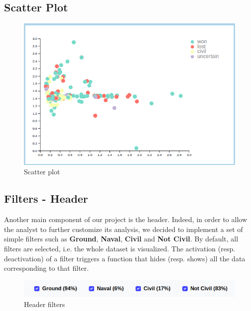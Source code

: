\subsection{Scatter Plot}
\begin{figure}[h]
\centering
\includegraphics[scale=0.30]{./images/scatter_plot.png}
\caption{Scatter plot}
\end{figure}

\subsection{Filters - Header}
Another main component of our project is the header. Indeed, in order to allow the analyst to further customize its analysis, we decided to implement a set of simple filters such as \textbf{Ground}, \textbf{Naval}, \textbf{Civil} and \textbf{Not Civil}. By default, all filters are selected, i.e. the whole dataset is visualized. The activation (resp. deactivation) of a filter triggers a function that hides (resp. shows) all the data corresponding to that filter.
\begin{figure}[h]
\centering
\includegraphics[scale=0.32]{./images/header_filters.png}
\caption{Header filters}
\end{figure}
